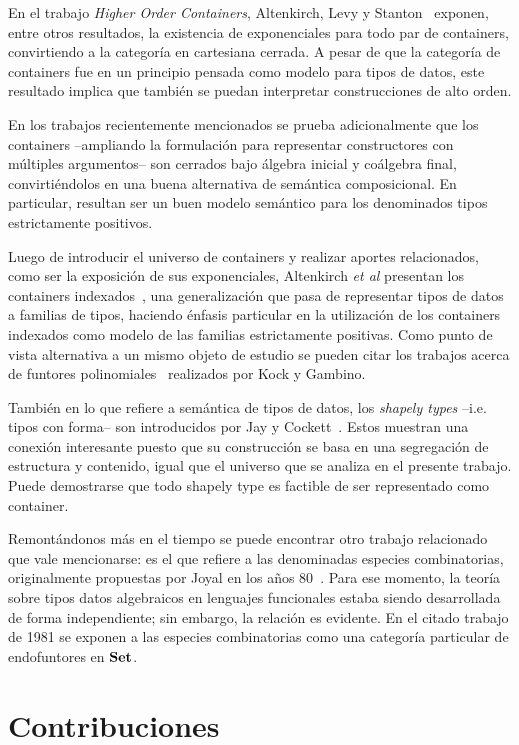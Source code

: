 En el trabajo {\it Higher Order Containers}, Altenkirch, Levy y Stanton~\cite{alti:2010} exponen, entre otros resultados, la existencia de exponenciales para todo par de containers, convirtiendo a la categoría en cartesiana cerrada. A pesar de que la categoría de containers fue en un principio pensada como modelo para tipos de datos, este resultado implica que también se puedan interpretar construcciones de alto orden. 

En los trabajos recientemente mencionados se prueba adicionalmente que los containers --ampliando la formulación para representar constructores con múltiples argumentos-- son cerrados bajo álgebra inicial y coálgebra final, convirtiéndolos en una buena alternativa de semántica composicional. En particular, resultan ser un buen modelo semántico para los denominados tipos estrictamente positivos.

Luego de introducir el universo de containers y realizar aportes relacionados, como ser la exposición de sus exponenciales, Altenkirch {\it et al} presentan los containers indexados~\cite{alti:2015}, una generalización que pasa de representar tipos de datos a familias de tipos, haciendo énfasis particular en la utilización de los containers indexados como modelo de las familias estrictamente positivas. Como punto de vista alternativa a un mismo objeto de estudio se pueden citar los trabajos acerca de funtores polinomiales~\cite{kock2010} realizados por Kock y Gambino.

También en lo que refiere a semántica de tipos de datos, los {\it shapely types} --i.e. tipos con forma-- son introducidos por Jay y Cockett~\cite{jay94,jay95}. Estos muestran una conexión interesante puesto que su construcción se basa en una segregación de estructura y contenido, igual que el universo que se analiza en el presente trabajo. Puede demostrarse que todo shapely type es factible de ser representado como container.

Remontándonos más en el tiempo se puede encontrar otro trabajo relacionado que vale mencionarse: es el que refiere a las denominadas especies combinatorias, originalmente propuestas por Joyal en los años 80~\cite{joyal1981}. Para ese momento, la teoría sobre tipos datos algebraicos en lenguajes funcionales estaba siendo desarrollada de forma independiente; sin embargo, la relación es evidente. En el citado trabajo de 1981 se exponen a las especies combinatorias como una categoría particular de endofuntores en $\mathbf{Set}$.


\section*{Contribuciones}


